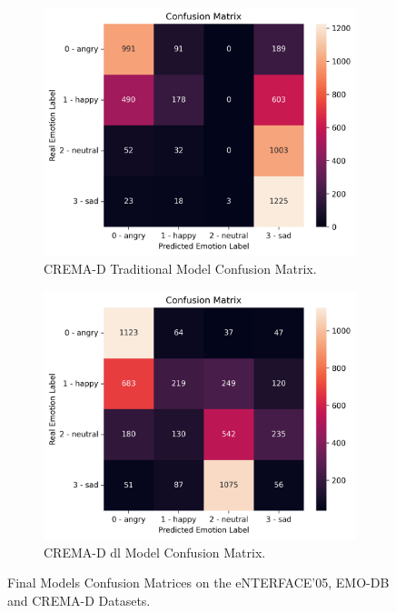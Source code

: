 \begin{figure}
	\begin{subfigure}{.5\textwidth}
		\centering
		\includegraphics[width=\linewidth]{figs/4_5_discussion/cre_trad_cm.png}
		\caption{CREMA-D Traditional Model Confusion Matrix.}
	\end{subfigure}%
	\begin{subfigure}{.5\textwidth}
		\centering
		\includegraphics[width=\linewidth]{figs/4_5_discussion/cre_deep_cm.png}
		\caption{CREMA-D \ac{dl} Model Confusion Matrix.}
	\end{subfigure}
	\caption{Final Models Confusion Matrices on the eNTERFACE'05, EMO-DB and CREMA-D Datasets.}
\end{figure}

